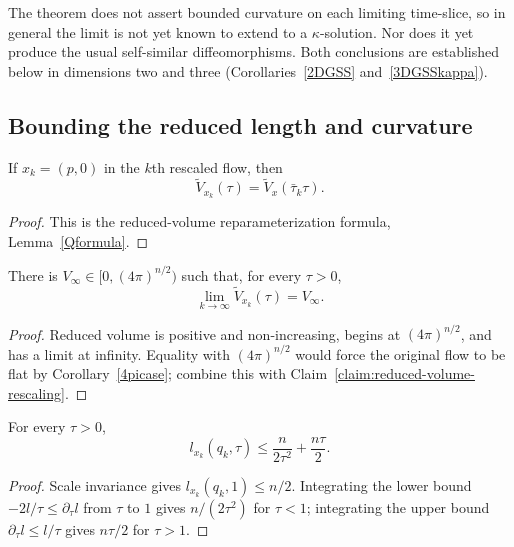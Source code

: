 \begin{remark}\label{rem:asymptotic-soliton-caveats}

The theorem does not assert bounded curvature on each limiting
time-slice, so in general the limit is not yet known to extend to a
$\kappa$-solution. Nor does it yet produce the usual self-similar
diffeomorphisms. Both conclusions are established below in dimensions
two and three (Corollaries~\ref{2DGSS} and~\ref{3DGSSkappa}).
\end{remark}

\subsection{Bounding the reduced length and curvature}

\begin{claim}\label{claim:reduced-volume-rescaling}
\label{scaleinv2}

If $x_k=(p,0)$ in the $k$th rescaled flow, then
\[
 \widetilde V_{x_k}(\tau)=\widetilde V_x(\bar\tau_k\tau).
\]
\end{claim}
\begin{proof}
\sketch This is the reduced-volume reparameterization formula,
Lemma~\ref{Qformula}.
\end{proof}

\begin{corollary}\label{cor:reduced-volume-limit-constant}
\label{redvolconst}

There is $V_\infty\in[0,(4\pi)^{n/2})$ such that, for every
$\tau>0$,
\begin{equation}\label{limVeqn}
 \lim_{k\to\infty}\widetilde V_{x_k}(\tau)=V_\infty.
\end{equation}
\end{corollary}
\begin{proof}
\sketch Reduced volume is positive and non-increasing, begins at
$(4\pi)^{n/2}$, and has a limit at infinity. Equality with
$(4\pi)^{n/2}$ would force the original flow to be flat by
Corollary~\ref{4picase}; combine this with
Claim~\ref{claim:reduced-volume-rescaling}.
\end{proof}

\begin{claim}\label{claim:qk-length-bound}
\label{tausqtau}

For every $\tau>0$,
\[
 l_{x_k}(q_k,\tau)\leq\frac{n}{2\tau^2}+\frac{n\tau}{2}.
\]
\end{claim}
\begin{proof}
\sketch
{}
Scale invariance gives $l_{x_k}(q_k,1)\leq n/2$. Integrating the
lower bound $-2l/\tau\leq\partial_\tau l$ from $\tau$ to $1$ gives
$n/(2\tau^2)$ for $\tau<1$; integrating the upper bound
$\partial_\tau l\leq l/\tau$ gives $n\tau/2$ for $\tau>1$.
\end{proof}


